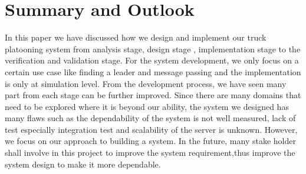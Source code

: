 \section{Summary and Outlook}

In this paper we have discussed how we design and implement our truck platooning system from analysis stage, design stage , implementation stage to the verification and validation stage. For the system development, we only focus on a certain use case like finding a leader and message passing and the implementation is only at simulation level. From the development process, we have seen many part from each stage can be further improved.  Since there are many domains that need to be explored where it is beyond our ability, the system we designed has many flaws such as the dependability of the system is not well measured, lack of test especially integration test and scalability of the server is unknown. However, we focus on our approach to building a system. In the future, many stake holder shall involve in this project to improve the system requirement,thus improve the system design to make it more dependable.

